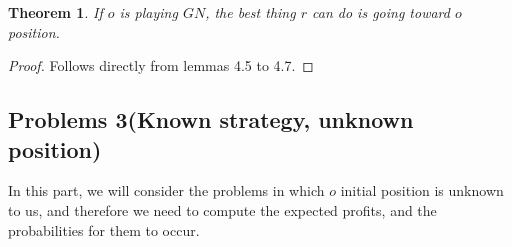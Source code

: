 \documentclass[a4paper,10pt]{article}
\newtheorem{theorem}{Theorem}[section]
\newcommand\rob{\ensuremath{r}\xspace}
\newcommand\opp{\ensuremath{o}\xspace}
\newcommand{\gn}{\ensuremath{GN}\xspace}
\begin{document}
\begin{theorem}
If \opp is playing \gn, the best thing \rob can do is going toward \opp position.
\end{theorem}
\begin{proof}
Follows directly from lemmas 4.5 to 4.7.
\end{proof}

\newpage

\subsection{Problems 3(Known strategy, unknown position)}\label{subsections: 1D, known strategy, hidden position}
In this part, we will consider the problems in which \opp initial position is unknown to us, and therefore we need to compute the expected profits, and the probabilities for them to occur.
\end{document}
